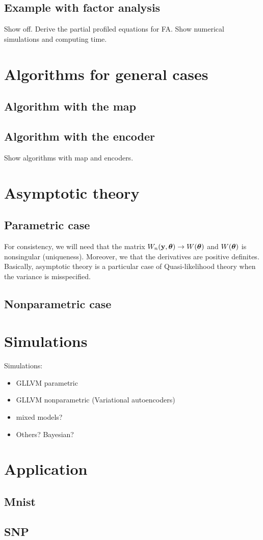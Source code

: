 \documentclass[twoside,11pt]{article}
\begin{document}
\subsection{Example with factor analysis}

Show off. Derive the partial profiled equations for FA.
Show numerical simulations and computing time.



\section{Algorithms for general cases}

\subsection{Algorithm with the map}

\subsection{Algorithm with the encoder}

Show algorithms with map and encoders.


\section{Asymptotic theory}

\subsection{Parametric case}

For consistency, we will need that the matrix $W_n({\bf y}, {\bm{\theta}}) \rightarrow W({\bm{\theta}})$ and $W({\bm{\theta}})$ is nonsingular (uniqueness).
Moreover, we that the derivatives are positive definites.
Basically, asymptotic theory is a particular case of Quasi-likelihood theory when the variance is misspecified.


\subsection{Nonparametric case}

\section{Simulations}

Simulations:
\begin{itemize}
    \item GLLVM parametric
    \item GLLVM nonparametric (Variational autoencoders)
    \item mixed models?
    \item Others? Bayesian?
\end{itemize}


\section{Application}

\subsection{Mnist}

\subsection{SNP}
\end{document}
